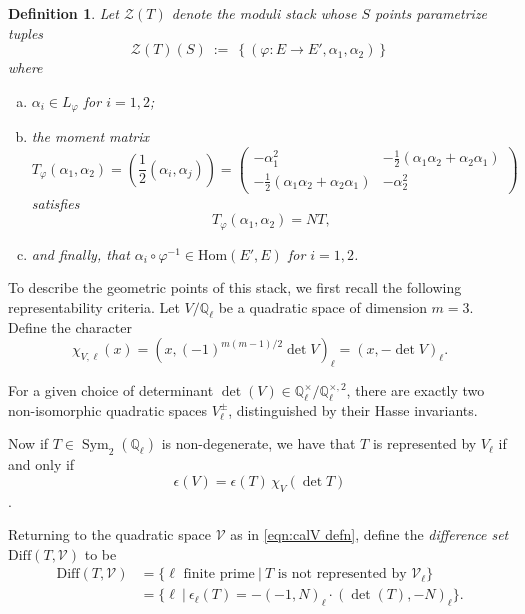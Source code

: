 \documentclass[reqno,oneside]{amsart}
\theoremstyle{plain}
\newtheorem{definition}[theorem]{Definition}
\theoremstyle{remark}
\numberwithin{theorem}{section}
\newcommand{\bbQ}{\mathbb Q}
\newcommand{\calV}{\mathcal V}
\newcommand{\calZ}{\mathcal Z}
\newcommand{\Hom}{\mathrm{Hom}}
\DeclareMathOperator{\Sym}{Sym}
\begin{document}
	\begin{definition} Let  $\calZ(T)$ denote the moduli stack whose $S$ points parametrize tuples
		\begin{equation}
		\calZ(T)(S) \ := \ \left\{  (\varphi\colon E \to E', \alpha_1, \alpha_2 )\right\}
		\end{equation}
		where
		\begin{enumerate}[(a)]
			\item $\alpha_i \in L_{\varphi}$ for $i=1,2$;
			\item the moment matrix
			$$
			T_{\varphi}(\alpha_1, \alpha_2) =( \frac{1}2 (\alpha_i, \alpha_j))= \begin{pmatrix} - \alpha_1^2 & -\frac12\left( \alpha_1 \alpha_2 + \alpha_2 \alpha_1\right) \\ -\frac12\left( \alpha_1 \alpha_2 + \alpha_2 \alpha_1\right) & - \alpha_2^2  \end{pmatrix}
			$$
			satisfies
			$$
			T_{\varphi}(\alpha_1, \alpha_2) = NT,
			$$
			\item	and finally, that $\alpha_i \circ \varphi^{-1} \in \Hom(E', E)$ for $i=1,2$.
		\end{enumerate}
	\end{definition}
	
	To describe the geometric points of this stack, we first recall the following representability criteria. Let $V / \mathbb Q_{\ell}$  be a quadratic space of dimension $m = 3$. Define the character
	\begin{equation}
	\chi_{V,\ell}(x)  = (x, (-1)^{m(m-1)/2} \det V)_{\ell} =  (x, - \det V)_{\ell}.
	\end{equation}
	
	For a given choice of determinant $\det(V) \in \bbQ_{\ell}^{\times} / \bbQ_{\ell}^{\times, 2}$, there are exactly two non-isomorphic quadratic spaces $V^{\pm}_{\ell}$, distinguished by their Hasse invariants.
	
	Now if $T \in \Sym_2(\bbQ_{\ell})$ is non-degenerate, we have that $T$ is represented by $V_{\ell}$ if and only if
	\begin{equation} \label{eqn:Hasse criterion}
	\epsilon(V) =  \epsilon(T)  \, \chi_V(\det T)
	\end{equation}
	\cite[Prop.\ 1.3]{KudlaCentralDerivs}.
	
	
	
	Returning to the quadratic space $\calV$ as in \eqref{eqn:calV defn}, define the \emph{difference set} $\mathrm{Diff}(T,\calV)$ to be
		\begin{align}
			\mathrm{Diff}(T,\calV) &= \{  \ell \text{ finite prime} \ | \  T \text{ is not represented by } \calV_{\ell}    \} \\
			&= \{  \ell \ | \ \epsilon_{\ell}(T) = - (-1, N)_{\ell} \cdot (\det(T), -N)_{\ell}   \}.
		\end{align}
\end{document}
